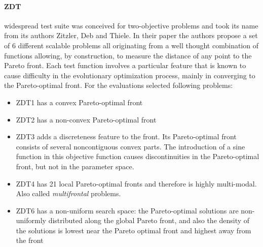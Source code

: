         \paragraph{ZDT} widespread test suite\cite{ZitzlerDT00} was conceived for two-objective problems and took its name from its authors Zitzler, Deb and Thiele. In their paper the authors propose a set of 6 different scalable problems all originating from a well thought combination of functions allowing, by construction, to measure the distance of any point to the Pareto front. Each test function involves a particular feature that is known to cause difficulty in the evolutionary optimization process, mainly in converging to the Pareto-optimal front.
        For the evaluations selected following problems:
        \begin{itemize}
            \item ZDT1 has a convex Pareto-optimal front
            \item ZDT2 has a non-convex Pareto-optimal front
            \item ZDT3 adds a discreteness feature to the front. Its Pareto-optimal front consists of several noncontiguous convex parts. The introduction of a sine function in this objective function causes discontinuities in the Pareto-optimal front, but not in the parameter space.
            \item ZDT4 has 21 local Pareto-optimal fronts and therefore is highly multi-modal. Also called \textit{multifrontal} problems.
            \item ZDT6 has a non-uniform search space: the Pareto-optimal solutions are non-uniformly distributed along the global Pareto front, and also the density of the solutions is lowest near the Pareto optimal front and highest away from the front
        \end{itemize}


